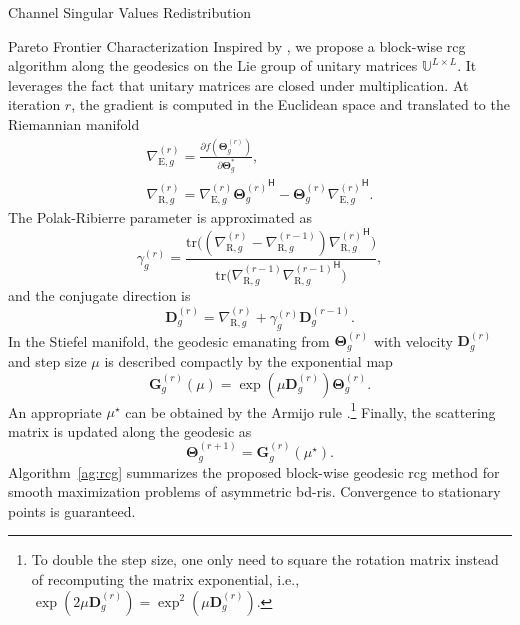 \documentclass[journal]{IEEEtran}
\begin{document}
\begin{section}{Channel Singular Values Redistribution}
\begin{subsection}{Pareto Frontier Characterization}
		Inspired by \cite{Abrudan2008,Abrudan2009}, we propose a block-wise \gls{rcg} algorithm along the geodesics on the Lie group of unitary matrices $\mathbb{U}^{L \times L}$.
		It leverages the fact that unitary matrices are closed under multiplication.
		At iteration $r$, the gradient is computed in the Euclidean space and translated to the Riemannian manifold \cite{Absil2009}
		\begin{gather}
			\nabla_{\mathrm{E},g}^{(r)} = \frac{\partial f(\mathbf{\Theta}_g^{(r)})}{\partial \mathbf{\Theta}_g^*},\label{eq:gradient_euclidean}\\
			\nabla_{\mathrm{R},g}^{(r)} = \nabla_{\mathrm{E},g}^{(r)} {\mathbf{\Theta}_g^{(r)}}^\mathsf{H} - \mathbf{\Theta}_g^{(r)} {\nabla_{\mathrm{E},g}^{(r)}}^\mathsf{H}.\label{eq:gradient_riemannian}
		\end{gather}
		The Polak-Ribierre parameter \cite{Polak1969} is approximated as \cite{Abrudan2009}
		\begin{equation}
			\gamma_g^{(r)} = \frac{\mathrm{tr}\bigl((\nabla_{\mathrm{R},g}^{(r)} - \nabla_{\mathrm{R},g}^{(r-1)}) {\nabla_{\mathrm{R},g}^{(r)}}^\mathsf{H}\bigr)}{\mathrm{tr}\bigl(\nabla_{\mathrm{R},g}^{(r-1)} {\nabla_{\mathrm{R},g}^{(r-1)}}^\mathsf{H}\bigr)},
			\label{eq:parameter_cg}
		\end{equation}
		and the conjugate direction is
		\begin{equation}
			\mathbf{D}_g^{(r)} = \nabla_{\mathrm{R},g}^{(r)} + \gamma_g^{(r)} \mathbf{D}_g^{(r-1)}.
			\label{eq:direction_cg}
		\end{equation}
		In the Stiefel manifold, the geodesic emanating from $\mathbf{\Theta}_g^{(r)}$ with velocity $\mathbf{D}_g^{(r)}$ and step size $\mu$ is described compactly by the exponential map \cite{Edelman1998}
		\begin{equation}
			\mathbf{G}_g^{(r)}(\mu) = \exp(\mu \mathbf{D}_g^{(r)}) \mathbf{\Theta}_g^{(r)}.
			\label{eq:geodesic}
		\end{equation}
		An appropriate $\mu^\star$ can be obtained by the Armijo rule \cite{Armijo1966}.\footnote{To double the step size, one only need to square the rotation matrix instead of recomputing the matrix exponential, i.e., $\exp(2 \mu \mathbf{D}_g^{(r)}) = \exp^2(\mu \mathbf{D}_g^{(r)})$.}
		Finally, the scattering matrix is updated along the geodesic as
		\begin{equation}
			\mathbf{\Theta}_g^{(r+1)} = \mathbf{G}_g^{(r)}(\mu^\star).
			\label{eq:update_geodesic}
		\end{equation}
		Algorithm~\ref{ag:rcg} summarizes the proposed block-wise geodesic \gls{rcg} method for smooth maximization problems of asymmetric \gls{bd}-\gls{ris}.
		Convergence to stationary points is guaranteed.


\end{subsection}
\end{section}
\end{document}
